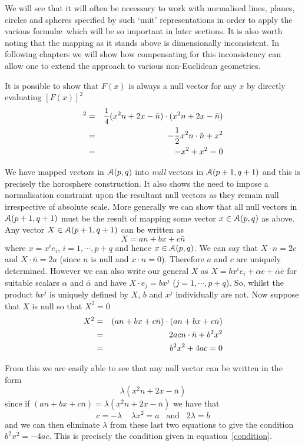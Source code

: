 We will see that it will often be necessary to work with
normalised lines, planes, circles and spheres specified by
such `unit' representations in order to
apply the various formul\ae\ which will be so
important in later sections. It is also worth noting that the
mapping as it stands above is dimensionally inconsistent. In following
chapters we will show how compensating for this inconsistency 
can allow one to extend the approach to various non-Euclidean geometries.

It is possible to show that $F(x)$ is always a null vector for
any $x$ by directly evaluating $[F(x)]^2$
%
\begin{eqnarray}
 [F(x)]^2 & = &  \frac{1}{4}(x^2n + 2x - \bar{n})\cdot (x^2n + 2x - \bar{n}) \nn \\
              & = & -\frac{1}{2}x^2 n\cdot \bar{n} + x^2  \nn \\
              & = &  -x^2 + x^2 = 0
\end{eqnarray}
%

We have mapped vectors in ${\mathcal{A}}(p,q)$ into \emph{null}
vectors in ${\mathcal{A}}(p+1,q+1)$ and this is precisely the horosphere 
construction. It also shows the need to impose a normalisation
constraint upon the resultant null vectors as they remain null 
irrespective of absolute scale.
More generally we can show that all null vectors in $\mathcal{A}(p+1,q+1)$
must be the result of mapping some vector $x \in \mathcal{A}(p,q)$ as above.
Any vector $X \in {\mathcal{A}}(p+1,q+1)$ can be written as
%
\[ X = an + bx + c\bar{n}  \]
%
where $x = x^ie_i$, $i=1,\cdots,p+q$ and hence $x \in \mathcal{A}(p,q)$.
We can say that $X\cdot n = 2c$ and $X\cdot \bar{n}=2a$ (since $n$ is 
null and $x\cdot n = 0$). Therefore $a$
and $c$ are uniquely determined. However we can also write our
general $X$ as  $X=b{x}^ie_i + \alpha e + \bar{\alpha}\bar{e}$ for 
suitable scalars $\alpha$ and $\bar{\alpha}$ and
have $X\cdot e_j= bx^j$ ($j=1,\cdots,p+q$). So, whilst the product
$bx^j$ is uniquely defined by $X$, $b$ and $x^j$ individually are
not. Now suppose that $X$ is null so that $X^2=0$
%
\begin{eqnarray}
X^2 & = &   (an + bx + c\bar{n})\cdot (an + bx + c\bar{n}) \nonumber \\
       & = &  2ac n\cdot \bar{n} + b^2x^2 \nonumber \\
       & = & b^2x^2 + 4ac = 0
       \label{condition}
\end{eqnarray}
%

From this we are easily able to see that any null vector can be
written in the form
%
\begin{equation}
\lambda (x^2n + 2x - \bar{n}) \label{null}
\end{equation} 
%
since if $(an + bx + c\bar{n}) = \lambda(x^2n + 2x -
\bar{n})$ we have that
%
\[c=-\lambda\;\;\;\; \lambda x^2 = a \;\;\;\mbox{and}\;\;\; 2\lambda = b\]
%
and we can then eliminate $\lambda$ from these last two
equations to give the condition $b^2 x^2 = -4ac$. This
is precisely the condition given in
equation~\ref{condition}.

